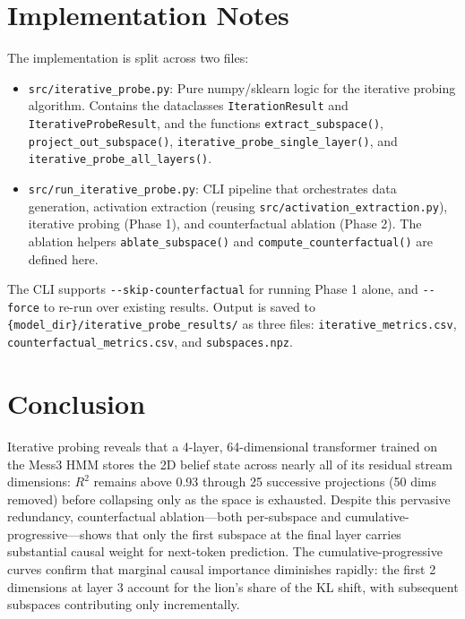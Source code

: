 \documentclass[11pt]{article}
\newcommand{\code}[1]{\texttt{#1}}
\begin{document}
\section{Implementation Notes}
\label{sec:implementation}

The implementation is split across two files:

\begin{itemize}
  \item \code{src/iterative\_probe.py}: Pure numpy/sklearn logic for the iterative probing algorithm.  Contains the dataclasses \code{IterationResult} and \code{IterativeProbeResult}, and the functions \code{extract\_subspace()}, \code{project\_out\_subspace()}, \code{iterative\_probe\_single\_layer()}, and \code{iterative\_probe\_all\_layers()}.
  \item \code{src/run\_iterative\_probe.py}: CLI pipeline that orchestrates data generation, activation extraction (reusing \code{src/activation\_extraction.py}), iterative probing (Phase 1), and counterfactual ablation (Phase 2).  The ablation helpers \code{ablate\_subspace()} and \code{compute\_counterfactual()} are defined here.
\end{itemize}

The CLI supports \code{-{}-skip-counterfactual} for running Phase 1 alone, and \code{-{}-force} to re-run over existing results.  Output is saved to \code{\{model\_dir\}/iterative\_probe\_results/} as three files: \code{iterative\_metrics.csv}, \code{counterfactual\_metrics.csv}, and \code{subspaces.npz}.

\section{Conclusion}
\label{sec:conclusion}

Iterative probing reveals that a 4-layer, 64-dimensional transformer trained on the Mess3 HMM stores the 2D belief state across nearly all of its residual stream dimensions: $R^2$ remains above 0.93 through 25 successive projections (50 dims removed) before collapsing only as the space is exhausted.  Despite this pervasive redundancy, counterfactual ablation---both per-subspace and cumulative-progressive---shows that only the first subspace at the final layer carries substantial causal weight for next-token prediction.  The cumulative-progressive curves confirm that marginal causal importance diminishes rapidly: the first 2 dimensions at layer 3 account for the lion's share of the KL shift, with subsequent subspaces contributing only incrementally.
\end{document}
